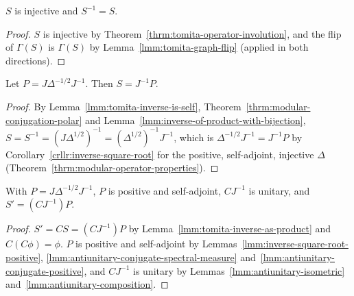 \begin{lemma}[$S^{-1} = S$]
    \label{lmm:tomita-inverse-is-self}
    \leanok
    $S$ is injective and $S^{-1} = S$.
\end{lemma}
\begin{proof}
    \leanok
    $S$ is injective by Theorem~\ref{thrm:tomita-operator-involution}, and the flip of $\Gamma(S)$ is $\Gamma(S)$ by Lemma~\ref{lmm:tomita-graph-flip} (applied in both directions).
\end{proof}

\begin{lemma}
    \label{lmm:tomita-inverse-as-product}
    \leanok
    Let $P = J\Delta^{-1/2}J^{-1}$. Then $S = J^{-1}P$.
\end{lemma}
\begin{proof}
    \leanok
    By Lemma~\ref{lmm:tomita-inverse-is-self}, Theorem~\ref{thrm:modular-conjugation-polar} and Lemma~\ref{lmm:inverse-of-product-with-bijection}, $S = S^{-1} = (J\Delta^{1/2})^{-1} = (\Delta^{1/2})^{-1}J^{-1}$, which is $\Delta^{-1/2}J^{-1} = J^{-1}P$ by Corollary~\ref{crllr:inverse-square-root} for the positive, self-adjoint, injective $\Delta$ (Theorem~\ref{thrm:modular-operator-properties}).
\end{proof}

\begin{lemma}
    \label{lmm:tomita-inverse-polar}
    \leanok
    With $P = J\Delta^{-1/2}J^{-1}$, $P$ is positive and self-adjoint, $CJ^{-1}$ is unitary, and $S' = (CJ^{-1})P$.
\end{lemma}
\begin{proof}
    \leanok
    $S' = CS = (CJ^{-1})P$ by Lemma~\ref{lmm:tomita-inverse-as-product} and $C(C\phi) = \phi$. $P$ is positive and self-adjoint by Lemmas~\ref{lmm:inverse-square-root-positive}, \ref{lmm:antiunitary-conjugate-spectral-measure} and~\ref{lmm:antiunitary-conjugate-positive}, and $CJ^{-1}$ is unitary by Lemmas~\ref{lmm:antiunitary-isometric} and~\ref{lmm:antiunitary-composition}.
\end{proof}

